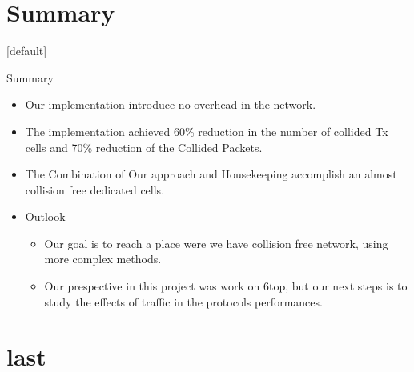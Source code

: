 \documentclass{beamer}
\makeatletter
\newenvironment{withoutheadline}{
        \setbeamertemplate{headline}[default]
        \def\beamer@entrycode{\vspace*{-\headheight}}
    }{}
\makeatother
\begin{document}
\section*{Summary}
\begin{withoutheadline}
\begin{frame}{Summary}
  \begin{itemize}
  \item
    Our implementation introduce  \alert{no overhead } in the network.
  \item
    The implementation \alert{achieved 60\% reduction} in the number of collided Tx cells and \alert{70\% reduction} of the Collided Packets.
  \item The Combination of Our approach and Housekeeping accomplish an \alert{ almost collision free dedicated cells}.
  \end{itemize}
  
  \begin{itemize}
  \item
    Outlook
    \begin{itemize}
    \item
     Our goal is to reach a place were we have collision free network, using more complex methods.
    \item
      Our prespective in this project was work on 6top, but our next steps is to study the effects of traffic in the protocols performances.
    \end{itemize}
  \end{itemize}
\end{frame}
\end{withoutheadline}

\section*{last}
\end{document}

